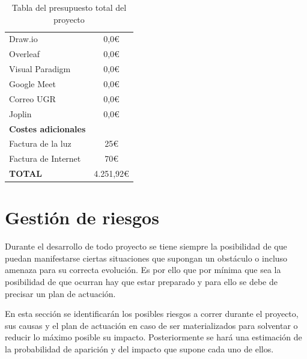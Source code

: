 \begin{table}[H]
\begin{tabular}{lc}
Draw.io                                                                                               & 0,0€                                 \\
Overleaf                                                                                              & 0,0€                                 \\
Visual Paradigm                                                                                       & 0,0€                                 \\
Google Meet                                                                                           & 0,0€                                 \\
Correo UGR                                                                                            & 0,0€                                 \\
Joplin                                                                                                & 0,0€                                 \\ \hline
\textbf{Costes adicionales}                                                                           & \multicolumn{1}{l}{}                 \\
Factura de la luz                                                                                     & 25€                                  \\
Factura de Internet                                                                                   & 70€                                  \\ \hline
\textbf{TOTAL}                                                                                        & \multicolumn{1}{l}{4.251,92€}       
\end{tabular}
\caption{Tabla del presupuesto total del proyecto}
\end{table}

\section{Gestión de riesgos}
Durante el desarrollo de todo proyecto se tiene siempre la posibilidad de que puedan manifestarse ciertas situaciones que supongan un obstáculo o incluso amenaza para su correcta evolución. Es por ello que por mínima que sea la posibilidad de que ocurran hay que estar preparado y para ello se debe de precisar un plan de actuación.

En esta sección se identificarán los posibles riesgos a correr durante el proyecto, sus causas y el plan de actuación en caso de ser materializados para solventar o reducir lo máximo posible su impacto. Posteriormente se hará una estimación de la probabilidad de aparición y del impacto que supone cada uno de ellos.

